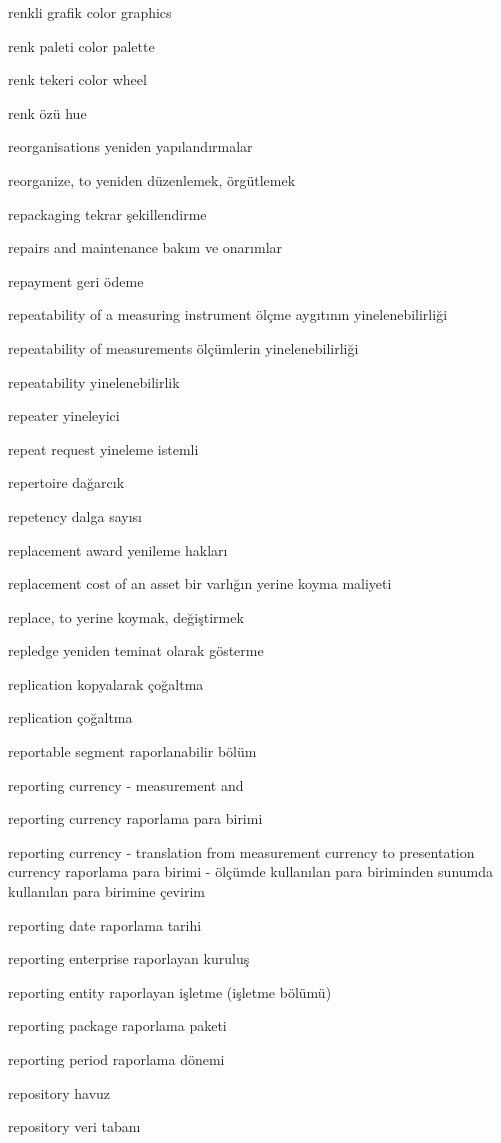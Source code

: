 \documentclass[12pt,fleqn]{article}\usepackage{../../common}
\begin{document}
renkli grafik color graphics

renk paleti color palette

renk tekeri color wheel

renk özü hue

reorganisations yeniden yapılandırmalar

reorganize, to yeniden düzenlemek, örgütlemek

repackaging tekrar şekillendirme

repairs and maintenance bakım ve onarımlar

repayment geri ödeme

repeatability of a measuring instrument ölçme aygıtının yinelenebilirliği

repeatability of measurements ölçümlerin yinelenebilirliği

repeatability yinelenebilirlik

repeater yineleyici

repeat request yineleme istemli

repertoire dağarcık

repetency dalga sayısı

replacement award yenileme hakları

replacement cost of an asset bir varlığın yerine koyma maliyeti

replace, to yerine koymak, değiştirmek

repledge yeniden teminat olarak gösterme

replication kopyalarak çoğaltma

replication çoğaltma

reportable segment raporlanabilir bölüm

reporting currency - measurement and

reporting currency raporlama para birimi

reporting currency - translation from measurement currency to presentation currency raporlama para birimi - ölçümde kullanılan para biriminden sunumda kullanılan para birimine çevirim

reporting date raporlama tarihi

reporting enterprise raporlayan kuruluş

reporting entity raporlayan işletme (işletme bölümü)

reporting package raporlama paketi

reporting period raporlama dönemi

repository havuz

repository veri tabanı
\end{document}
